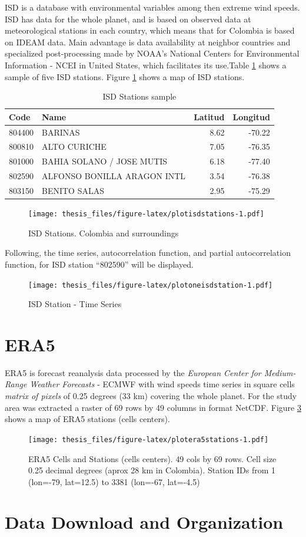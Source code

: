 \documentclass[12pt,oneside]{reedthesis}
\begin{document}
ISD is a database with environmental variables among then extreme wind speeds. ISD has data for the whole planet, and is based on observed data at meteorological stations in each country, which means that for Colombia is based on IDEAM data. Main advantage is data availability at neighbor countries and specialized post-processing made by NOAA's National Centers for Environmental Information - NCEI in United States, which facilitates its use.Table \ref{tab:tableisdstations} shows a sample of five ISD stations. Figure \ref{fig:plotisdstations} shows a map of ISD stations.
\begin{longtable}[t]{llrr}
\caption[ISD Stations]{\label{tab:tableisdstations}ISD Stations sample}\\
\toprule
Code & Name & Latitud & Longitud\\
\midrule
804400 & BARINAS & 8.62 & -70.22\\
800810 & ALTO CURICHE & 7.05 & -76.35\\
801000 & BAHIA SOLANO / JOSE MUTIS & 6.18 & -77.40\\
802590 & ALFONSO BONILLA ARAGON INTL & 3.54 & -76.38\\
803150 & BENITO SALAS & 2.95 & -75.29\\
\bottomrule
\end{longtable}
\begin{figure}
\centering
\texttt{[image: thesis\_files/figure-latex/plotisdstations-1.pdf]}
\caption{\label{fig:plotisdstations}ISD Stations. Colombia and surroundings}
\end{figure}
Following, the time series, autocorrelation function, and partial autocorrelation function, for ISD station ``802590'' will be displayed.
\begin{figure}
\centering
\texttt{[image: thesis\_files/figure-latex/plotoneisdstation-1.pdf]}
\caption{\label{fig:plotoneisdstation}ISD Station - Time Series}
\end{figure}
\hypertarget{era5}{%
\section{ERA5}\label{era5}}

ERA5 is forecast reanalysis data processed by the \emph{European Center for Medium-Range Weather Forecasts} - ECMWF with wind speeds time series in square cells \emph{matrix of pixels} of 0.25 degrees (33 km) covering the whole planet. For the study area was extracted a raster of 69 rows by 49 columns in format NetCDF. Figure \ref{fig:plotera5stations} shows a map of ERA5 stations (cells centers).
\begin{figure}
\centering
\texttt{[image: thesis\_files/figure-latex/plotera5stations-1.pdf]}
\caption{\label{fig:plotera5stations}ERA5 Cells and Stations (cells centers). 49 cols by 69 rows. Cell size 0.25 decimal degrees (aprox 28 km in Colombia). Station IDs from 1 (lon=-79, lat=12.5) to 3381 (lon=-67, lat=-4.5)}
\end{figure}
\hypertarget{data-download-and-organization}{%
\section{Data Download and Organization}\label{data-download-and-organization}}
\end{document}
